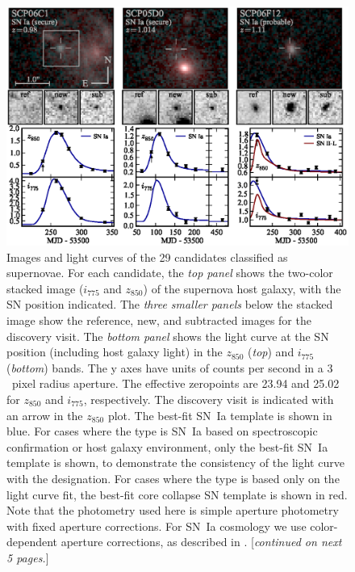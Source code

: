 
\begin{figure}[!b]
\includegraphics[width=\textwidth]{figures/cands/sn1.eps}
\caption[Images and light curves of candidates classified as
  supernovae.]{Images and light curves of the 29 candidates classified
  as supernovae. For each candidate, the \emph{top panel} shows the
  two-color stacked image ($i_{775}$ and $z_{850}$) of the supernova
  host galaxy, with the SN position indicated. The \emph{three smaller
    panels} below the stacked image show the reference, new, and
  subtracted images for the discovery visit. The \emph{bottom panel}
  shows the light curve at the SN position (including host galaxy
  light) in the $z_{850}$ ({\it top}) and $i_{775}$ ({\it bottom})
  bands. The y axes have units of counts per second in a $3$~pixel
  radius aperture. The effective zeropoints are 23.94 and 25.02 for
  $z_{850}$ and $i_{775}$, respectively. The discovery visit is
  indicated with an arrow in the $z_{850}$ plot. The best-fit SN~Ia
  template is shown in blue. For cases where the type is SN~Ia based
  on spectroscopic confirmation or host galaxy environment, only the
  best-fit SN~Ia template is shown, to demonstrate the consistency of
  the light curve with the designation. For cases where the type is
  based only on the light curve fit, the best-fit core collapse SN
  template is shown in red.  Note that the photometry used here is
  simple aperture photometry with fixed aperture corrections. For
  SN~Ia cosmology we use color-dependent aperture corrections, as
  described in \citet{suzuki11a}. [\emph{continued on next 5 pages.}]
\label{fig:sn}}
\end{figure}

